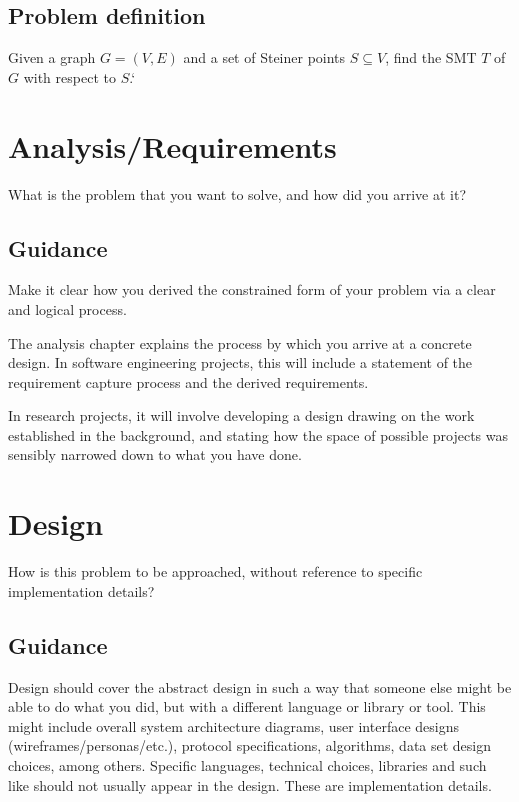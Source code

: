 \documentclass{l4proj}
\begin{document}
\section{Problem definition}

Given a graph $G = (V, E)$ and a set of Steiner points $S \subseteq V$, find the SMT $T$ of $G$ with respect to $S$.`


\chapter{Analysis/Requirements}
What is the problem that you want to solve, and how did you arrive at it?
\section{Guidance}
Make it clear how you derived the constrained form of your problem via a clear and logical process.

The analysis chapter explains the process by which you arrive at a concrete design. In software
engineering projects, this will include a statement of the requirement capture process and the
derived requirements.

In research projects, it will involve developing a design drawing on
the work established in the background, and stating how the space of possible projects was
sensibly narrowed down to what you have done.

\chapter{Design}
How is this problem to be approached, without reference to specific implementation details?
\section{Guidance}
Design should cover the abstract design in such a way that someone else might be able to do what you did,
but with a different language or library or tool. This might include overall system architecture diagrams,
user interface designs (wireframes/personas/etc.), protocol specifications, algorithms, data set design choices,
among others. Specific languages, technical choices, libraries and such like should not usually appear in the design. These are implementation details.
\end{document}
